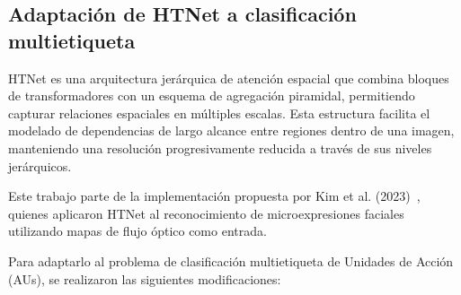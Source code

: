 \documentclass[conference]{IEEEtran}
\begin{document}
\subsection{Adaptación de HTNet a clasificación multietiqueta}

HTNet es una arquitectura jerárquica de atención espacial que combina bloques de transformadores con un esquema de agregación piramidal, permitiendo capturar relaciones espaciales en múltiples escalas. Esta estructura facilita el modelado de dependencias de largo alcance entre regiones dentro de una imagen, manteniendo una resolución progresivamente reducida a través de sus niveles jerárquicos.

Este trabajo parte de la implementación propuesta por Kim et al. (2023)~\cite{kim2023htnet}, quienes aplicaron HTNet al reconocimiento de microexpresiones faciales utilizando mapas de flujo óptico como entrada.

Para adaptarlo al problema de clasificación multietiqueta de Unidades de Acción (AUs), se realizaron las siguientes modificaciones:
\end{document}
